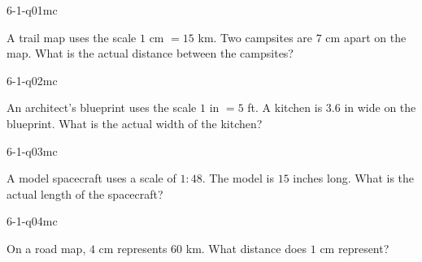 

\begin{practiceQuestion}{6-1-q01}{mc}
\begin{questionText}
A trail map uses the scale $1$ cm $= 15$ km. Two campsites are $7$ cm apart on the map. What is the actual distance between the campsites?
\end{questionText}
\end{practiceQuestion}

\begin{practiceQuestion}{6-1-q02}{mc}
\begin{questionText}
An architect's blueprint uses the scale $1$ in $= 5$ ft. A kitchen is $3.6$ in wide on the blueprint. What is the actual width of the kitchen?
\end{questionText}
\end{practiceQuestion}

\begin{practiceQuestion}{6-1-q03}{mc}
\begin{questionText}
A model spacecraft uses a scale of $1:48$. The model is $15$ inches long. What is the actual length of the spacecraft?
\end{questionText}
\end{practiceQuestion}

\begin{practiceQuestion}{6-1-q04}{mc}
\begin{questionText}
On a road map, $4$ cm represents $60$ km. What distance does $1$ cm represent?
\end{questionText}
\end{practiceQuestion}

